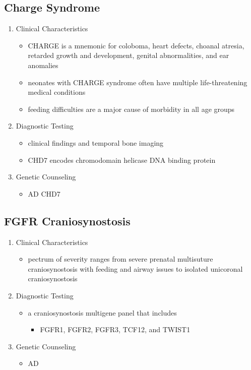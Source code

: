 \documentclass[12pt]{scrartcl}
\begin{document}
\subsection{Charge Syndrome}
\label{sec:org67a9724}
\begin{enumerate}
\item Clinical Characteristics
\label{sec:orgcf61898}
\begin{itemize}
\item CHARGE is a mnemonic for coloboma, heart defects, choanal atresia,
retarded growth and development, genital abnormalities, and ear
anomalies
\item neonates with CHARGE syndrome often have multiple life-threatening
medical conditions
\item feeding difficulties are a major cause of
morbidity in all age groups
\end{itemize}
\item Diagnostic Testing
\label{sec:org0d05e6e}
\begin{itemize}
\item clinical findings and temporal bone imaging
\item CHD7 encodes chromodomain helicase DNA binding protein
\end{itemize}
\item Genetic Counseling
\label{sec:org9f05cd1}
\begin{itemize}
\item AD CHD7
\end{itemize}
\end{enumerate}
\subsection{FGFR Craniosynostosis}
\label{sec:org47195ea}
\begin{enumerate}
\item Clinical Characteristics
\label{sec:orga024802}
\begin{itemize}
\item pectrum of severity ranges from severe prenatal multisuture
craniosynostosis with feeding and airway issues to isolated
unicoronal craniosynostosis
\end{itemize}
\item Diagnostic Testing
\label{sec:org10d7ce4}
\begin{itemize}
\item a craniosynostosis multigene panel that includes
\begin{itemize}
\item FGFR1, FGFR2, FGFR3, TCF12, and TWIST1
\end{itemize}
\end{itemize}
\item Genetic Counseling
\label{sec:orgb2ca48d}
\begin{itemize}
\item AD
\end{itemize}
\end{enumerate}
\end{document}
